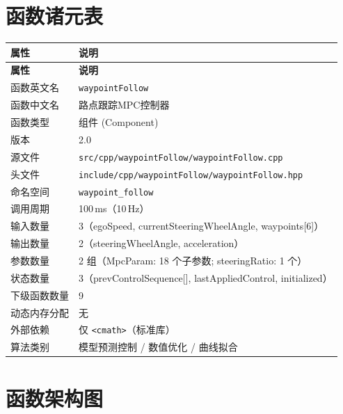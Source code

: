 \documentclass[a4paper,10pt]{article}
\begin{document}
\section{函数诸元表}

\renewcommand{\arraystretch}{1.3}
\begin{longtable}{|L{3.8cm}|L{11.5cm}|}
\hline
\textbf{属性} & \textbf{说明} \\
\hline
\endfirsthead
\hline
\textbf{属性} & \textbf{说明} \\
\hline
\endhead
函数英文名 & \texttt{waypointFollow} \\
\hline
函数中文名 & 路点跟踪MPC控制器 \\
\hline
函数类型 & 组件 (Component) \\
\hline
版本 & 2.0 \\
\hline
源文件 & \texttt{src/cpp/waypointFollow/waypointFollow.cpp} \\
\hline
头文件 & \texttt{include/cpp/waypointFollow/waypointFollow.hpp} \\
\hline
命名空间 & \texttt{waypoint\_follow} \\
\hline
调用周期 & 100\,ms（10\,Hz） \\
\hline
输入数量 & 3（egoSpeed, currentSteeringWheelAngle, waypoints[6]） \\
\hline
输出数量 & 2（steeringWheelAngle, acceleration） \\
\hline
参数数量 & 2 组（MpcParam: 18 个子参数; steeringRatio: 1 个） \\
\hline
状态数量 & 3（prevControlSequence[], lastAppliedControl, initialized） \\
\hline
下级函数数量 & 9 \\
\hline
动态内存分配 & 无 \\
\hline
外部依赖 & 仅 \texttt{<cmath>}（标准库） \\
\hline
算法类别 & 模型预测控制 / 数值优化 / 曲线拟合 \\
\hline
\end{longtable}

\section{函数架构图}
\end{document}
